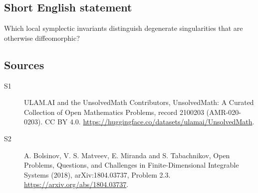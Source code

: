 \documentclass[11pt]{article}
\begin{document}
\subsection{Short English statement}
Which local symplectic invariants distinguish degenerate singularities that are otherwise diffeomorphic?
\subsection{Sources}
\begin{description}
\item[\hypertarget{source:2100203:1}{S1}] ULAM.AI and the UnsolvedMath Contributors, UnsolvedMath: A Curated Collection of Open Mathematics Problems, record 2100203 (AMR-020-0203). CC BY 4.0. \url{https://huggingface.co/datasets/ulamai/UnsolvedMath}.
\item[\hypertarget{source:2100203:2}{S2}] A. Bolsinov, V. S. Matveev, E. Miranda and S. Tabachnikov, Open Problems, Questions, and Challenges in Finite-Dimensional Integrable Systems (2018), arXiv:1804.03737, Problem 2.3. \url{https://arxiv.org/abs/1804.03737}.
\end{description}
\label{end:2100203}
\end{document}
